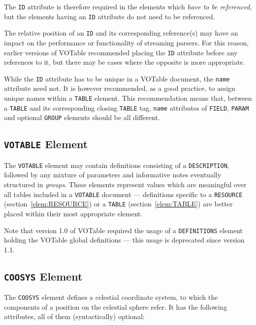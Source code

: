 \documentclass[11pt,a4paper]{ivoa}
\def\Aref#1{section~\ref{#1}}
\let\fg=\color
\def\slash {{\fg{blue}/}}
\def\attr#1{{\tt{\fg{DarkRed}#1}}}
\def\elem#1{{\tt{\fg{DarkRed}#1}}}
\begin{document}
The {\attr{ID}} attribute %
is therefore required in the elements which {\em have to be referenced},
but the elements having an {\attr{ID}} attribute do not need to be
referenced.

The relative position of an \attr{ID} and its corresponding reference(s)
may have an impact on the performance or functionality of streaming parsers.
For this reason, earlier versions of VOTable recommended placing
the \attr{ID} attribute before any references to it,
but there may be cases where the opposite is more appropriate.

While the {\attr{ID}} attribute has to be unique in a VOTable document,
the {\attr{name}} attribute need not. It is however recommended,
as a good practice, to assign unique names within a \elem{TABLE} element.
This recommendation means that,
between a \elem{TABLE} and its corresponding closing \elem{\slash TABLE} tag,
{\attr{name}} attributes of \elem{FIELD}, \elem{PARAM} and
optional \elem{GROUP} elements should be all different.

\subsection{\elem{VOTABLE} Element}
\label{sec:definitions}

The \elem{VOTABLE} element may contain definitions consisting of
a \elem{DESCRIPTION}, followed by any mixture of parameters and
informative notes eventually structured in {\em groups}.
These elements represent values which are meaningful over all tables
included in a \elem{VOTABLE} document --- definitions specific to
a \elem{RESOURCE} (\Aref{elem:RESOURCE})
or a \elem{TABLE} (\Aref{elem:TABLE}) are better placed
within their most appropriate element.

Note that version 1.0 of VOTable required the usage of a \elem{DEFINITIONS}
element holding the VOTable global definitions --- this
usage is deprecated since version 1.1.

\subsection{\elem{COOSYS} Element}
\label{elem:COOSYS}

The \elem{COOSYS} element defines a celestial coordinate system, to
which the components of a position on the celestial sphere refer.  It
has the following attributes, all of them (syntactically) optional:
\end{document}
